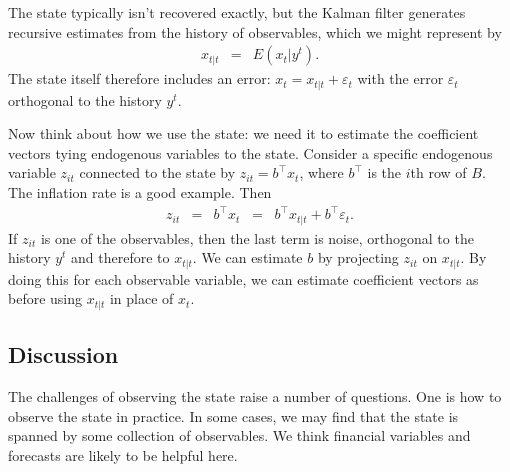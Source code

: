 \documentclass[11pt]{article}
\begin{document}
{The state typically isn't recovered exactly, but the Kalman filter generates
recursive estimates from the history of observables, which we might represent by
\begin{eqnarray*}
    {x}_{t|t} &=& E \left( x_t | y^{t} \right).
\end{eqnarray*}
The state itself therefore includes an error:  $ x_t = {x}_{t|t} + \varepsilon_t $
with the error $\varepsilon_t$ orthogonal to the history $y^{t}$.

Now think about how we use the state:  we need it to
estimate the coefficient vectors tying endogenous variables to the state.
Consider a specific endogenous variable $z_{it}$ connected to the state by
$ z_{it} = b^\top x_t $, where $b^\top$ is the $i$th row of $B$.
The inflation rate is a good example.
Then
\begin{eqnarray*}
    z_{it}  &=& b^\top x_t
        \;\;=\;\; b^\top {x}_{t|t} + b^\top \varepsilon_t .
\end{eqnarray*}
If $z_{it}$ is one of the observables, then the last term is noise, orthogonal to the history $y^t$
and therefore to $x_{t|t}$.
We can estimate $b$ by projecting $z_{it}$ on $x_{t|t}$. %
By doing this for each observable variable,
we can estimate coefficient vectors as before
using ${x}_{t|t}$ in place of $x_t$.



\subsection{Discussion}
\label{sec:state-discussion}

The challenges of observing the state raise a number of questions.
One is how to observe the state in practice.
In some cases, we may find that the state is spanned by
some collection of observables.
We think financial variables and forecasts are likely to be helpful here.

}
\end{document}
